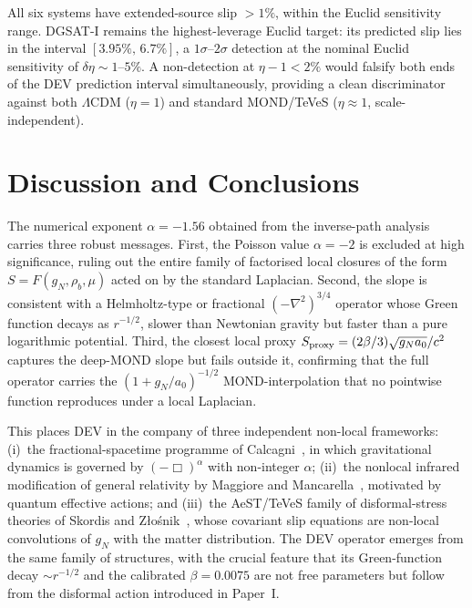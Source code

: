\documentclass[aps,prd,twocolumn,superscriptaddress,nofootinbib]{revtex4-2}
\newcommand{\aO}{a_0}
\newcommand{\LCDM}{$\Lambda$CDM}
\begin{document}
All six systems have extended-source slip $>1\%$,
within the Euclid sensitivity range.
DGSAT-I remains the highest-leverage Euclid target:
its predicted slip lies in the interval
$[3.95\%,\,6.7\%]$, a $1\sigma$--$2\sigma$ detection
at the nominal Euclid sensitivity of
$\delta\eta\sim 1$--$5\%$.
A non-detection at $\eta-1 < 2\%$ would falsify both
ends of the DEV prediction interval simultaneously,
providing a clean discriminator against both \LCDM{}
($\eta=1$) and standard MOND/TeVeS ($\eta\approx1$,
scale-independent).

\section{Discussion and Conclusions}
\label{sec:discuss}

The numerical exponent $\alpha = -1.56$ obtained from the
inverse-path analysis carries three robust messages.
First, the Poisson value $\alpha = -2$ is excluded at high
significance, ruling out the entire family of factorised
local closures of the form $S = F(g_N,\rho_b,\mu)$ acted
on by the standard Laplacian. Second, the slope is
consistent with a Helmholtz-type or fractional
$(-\nabla^2)^{3/4}$ operator whose Green function decays
as $r^{-1/2}$, slower than Newtonian gravity but faster
than a pure logarithmic potential. Third, the closest
local proxy $S_{\rm proxy}=(2\beta/3)\sqrt{g_N\aO}/c^2$
captures the deep-MOND slope but fails outside it,
confirming that the full operator carries the
$(1+g_N/\aO)^{-1/2}$ MOND-interpolation that no pointwise
function reproduces under a local Laplacian.

This places DEV in the company of three independent
non-local frameworks: (i)~the fractional-spacetime
programme of Calcagni~\cite{Calcagni2021}, in which
gravitational dynamics is governed by $(-\Box)^\alpha$
with non-integer $\alpha$;
(ii)~the nonlocal infrared modification of general
relativity by Maggiore and
Mancarella~\cite{MaggioreMancarella2014},
motivated by quantum effective actions; and (iii)~the
AeST/TeVeS family of disformal-stress theories of
Skordis and Z\l{}o\'snik~\cite{Skordis2021},
whose covariant slip equations are non-local convolutions
of $g_N$ with the matter distribution. The DEV operator
emerges from the same family of structures, with the
crucial feature that its Green-function decay
$\sim r^{-1/2}$ and the calibrated $\beta = 0.0075$ are
not free parameters but follow from the disformal action
introduced in Paper~I.
\end{document}
